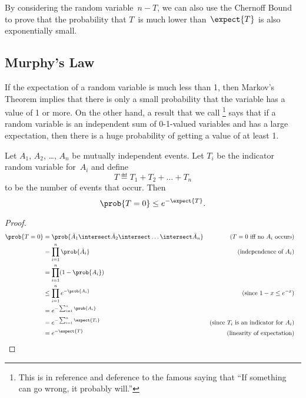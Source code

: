 By considering the random variable~$n - T$, we can also use the
Chernoff Bound to prove that the probability that $T$~is much lower
than~$\expect{T}$ is also exponentially small.  

\subsection{Murphy's Law}

If the expectation of a random variable is much less than 1, then
Markov's Theorem implies that there is only a small probability that
the variable has a value of 1 or more.  On the other hand, a result
that we call \footnote{This is in reference and
  deference to the famous saying that ``If something can go wrong, it probably
  will.''} says that if a random variable is an independent
sum of 0-1-valued variables and has a large expectation, then there is
a huge probability of getting a value of at least 1.


\begin{theorem}\label{th:murphy}
Let $A_1$, $A_2$, \dots, $A_n$ be mutually independent events.  Let
$T_i$ be the indicator random variable for~$A_i$ and define
\begin{equation*}
    T \eqdef T_1 + T_2 + \dots + T_n
\end{equation*}
to be the number of events that occur.  Then
\begin{equation*}
    \prob{T = 0} \le e^{- \expect{T}}.
\end{equation*}
\end{theorem}

\begin{proof}
\begin{align*}
\prob{T = 0}
    &= \prob{ \bar{A}_1 \intersect \bar{A}_2 \intersect \dots
  \intersect \bar{A}_n } 
        & \text{($T=0$ iff no $A_i$ occurs)}\\
    &= \prod_{i = 1}^n \prob{\bar{A}_i}
        & \text{(independence of $A_i$)} \\
    &= \prod_{i = 1}^n (1 - \prob{A_i}) \\
    &\le \prod_{i = 1}^n e^{-\prob{A_i}}
        & \text{(since $1 - x \le e^{-x}$)} \\
    &= e^{-\sum_{i = 1}^n \prob{A_i}} \\
    &= e^{-\sum_{i = 1}^n \expect{T_i}} 
        & \text{(since $T_i$ is an indicator for $A_i$)} \\
    &= e^{-\expect{T}}
        & \text{(linearity of expectation)}
        & \qedhere
\end{align*}
\end{proof}

